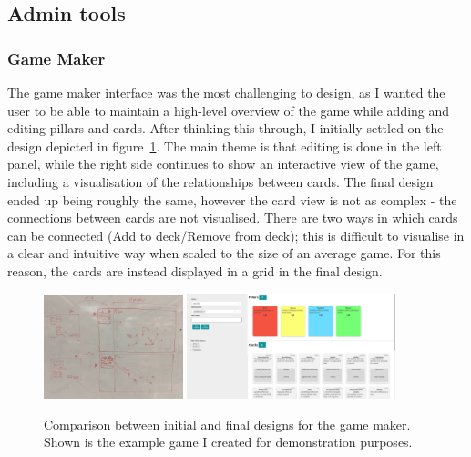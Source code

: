 \subsection{Admin tools}

\subsubsection{Game Maker}
The game maker interface was the most challenging to design, as I wanted the user to be able to maintain a high-level overview of the game while adding and editing pillars and cards.
After thinking this through, I initially settled on the design depicted in figure~\ref{fig:game_maker}. The main theme is that editing is done in the left panel, while the right side continues to show an interactive view of the game, including a visualisation of the relationships between cards.
The final design ended up being roughly the same, however the card view is not as complex - the connections between cards are not visualised. 
There are two ways in which cards can be connected (Add to deck/Remove from deck); this is difficult to visualise in a clear and intuitive way when scaled to the size of an average game. For this reason, the cards are instead displayed in a grid in the final design.

\begin{figure}[!h]
	\centering
	\includegraphics[width=0.36\textwidth]{./images/design/game_maker_drawing.png}
	\includegraphics[width=0.54\textwidth]{./images/design/game_maker.png}
	\caption{Comparison between initial and final designs for the game maker. Shown is the example game I created for demonstration purposes.}
	\label{fig:game_maker}
\end{figure}

